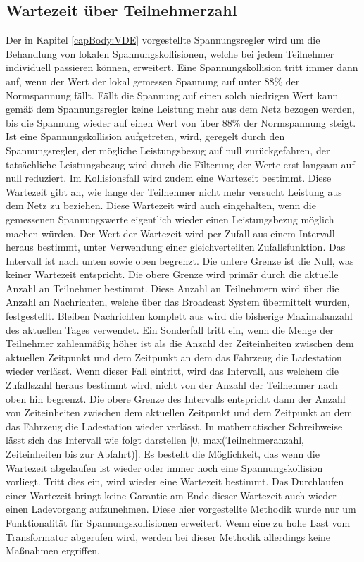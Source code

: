 \subsection{Wartezeit über Teilnehmerzahl}
\label{cap:background_sec:SA_participants}
Der in Kapitel \ref{capBody:VDE} vorgestellte Spannungsregler wird um die Behandlung von lokalen Spannungskollisionen, welche bei jedem Teilnehmer individuell passieren können, erweitert. Eine Spannungskollision tritt immer dann auf, wenn der Wert der lokal gemessen Spannung auf unter 88\% der Normspannung fällt. Fällt die Spannung auf einen solch niedrigen Wert kann gemäß dem Spannungsregler keine Leistung mehr aus dem Netz bezogen werden, bis die Spannung wieder auf einen Wert von über 88\% der Normspannung steigt. Ist eine Spannungskollision aufgetreten, wird, geregelt durch den Spannungsregler, der mögliche Leistungsbezug auf null zurückgefahren, der tatsächliche Leistungsbezug wird durch die Filterung der Werte erst langsam auf null reduziert. Im Kollisionsfall wird zudem eine Wartezeit bestimmt. Diese Wartezeit gibt an, wie lange der Teilnehmer nicht mehr versucht Leistung aus dem Netz zu beziehen. Diese Wartezeit wird auch eingehalten, wenn die gemessenen Spannungswerte eigentlich wieder einen Leistungsbezug möglich machen würden. Der Wert der Wartezeit wird per Zufall aus einem Intervall heraus bestimmt, unter Verwendung einer gleichverteilten Zufallsfunktion. Das Intervall ist nach unten sowie oben begrenzt. Die untere Grenze ist die Null, was keiner Wartezeit entspricht. Die obere Grenze wird primär durch die aktuelle Anzahl an Teilnehmer bestimmt. Diese Anzahl an Teilnehmern wird über die Anzahl an Nachrichten, welche über das Broadcast System übermittelt wurden, festgestellt. Bleiben Nachrichten komplett aus wird die bisherige Maximalanzahl des aktuellen Tages verwendet. Ein Sonderfall tritt ein, wenn die Menge der Teilnehmer zahlenmäßig höher ist als die Anzahl der Zeiteinheiten zwischen dem aktuellen Zeitpunkt und dem Zeitpunkt an dem das Fahrzeug die Ladestation wieder verlässt. Wenn dieser Fall eintritt, wird das Intervall, aus welchem die Zufallszahl heraus bestimmt wird, nicht von der Anzahl der Teilnehmer nach oben hin begrenzt. Die obere Grenze des Intervalls entspricht dann der Anzahl von Zeiteinheiten zwischen dem aktuellen Zeitpunkt und dem Zeitpunkt an dem das Fahrzeug die Ladestation wieder verlässt.  In mathematischer Schreibweise lässt sich das Intervall wie folgt darstellen [0, max(Teilnehmeranzahl, Zeiteinheiten bis zur Abfahrt)]. Es besteht die Möglichkeit, das wenn die Wartezeit abgelaufen ist wieder oder immer noch eine Spannungskollision vorliegt. Tritt dies ein, wird wieder eine Wartezeit bestimmt. Das Durchlaufen einer Wartezeit bringt keine Garantie am Ende dieser Wartezeit auch wieder einen Ladevorgang aufzunehmen. Diese hier vorgestellte Methodik wurde nur um Funktionalität für Spannungskollisionen erweitert. Wenn eine zu hohe Last vom Transformator abgerufen wird, werden bei dieser Methodik allerdings keine Maßnahmen ergriffen. \\
